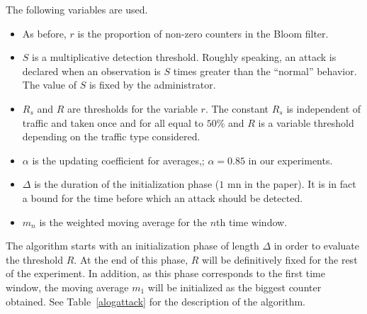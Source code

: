 \documentclass{amsart}
\begin{document}
The following variables are used. 
\begin{itemize}
\item As before, $r$ is the proportion of non-zero counters in the Bloom filter. 
\item $S$ is a multiplicative detection threshold. Roughly speaking, an attack is declared
when an observation is $S$ times greater than the ``normal'' behavior. The value of $S$ is fixed  by
the administrator. 
\item $R_s$ and  $R$ are thresholds for the variable $r$. The constant $R_s$  is 
 independent of traffic and  taken once and for all  equal to $50$\%  and $R$ is a
 variable threshold depending on the traffic type considered.  
\item $\alpha$ is the updating coefficient for averages,; $\alpha = 0.85$ in our experiments. 
\item $\Delta$ is the  duration of the initialization phase ($1$ mn in the paper). It is in fact a bound for the time before which
an attack should be detected.
\item $m_n$ is the weighted moving average for the $n$th time window.
\end{itemize}
The algorithm starts with an initialization phase of length $\Delta$ in order to evaluate
the threshold $R$. At the end of this phase,
$R$ will be definitively fixed for the rest of the experiment.  In addition, as this phase
corresponds to the first time window, the moving average $m_1$ will be initialized as the
biggest counter obtained.  See Table~\ref{alogattack} for the description of the algorithm.
\end{document}
